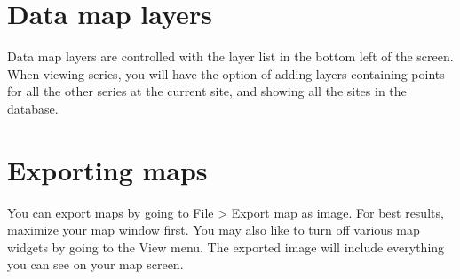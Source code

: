 \section{Data map layers}
Data map layers are controlled with the layer list in the bottom left of the screen. When viewing series, you will have the option of adding layers containing points for all the other series at the current site, and showing all the sites in the database. 


\section{Exporting maps}

You can export maps by going to File > Export map as image. For best results, maximize your map window first. You may also like to turn off various map widgets by going to the View menu. The exported image will include everything you can see on your map screen. 
